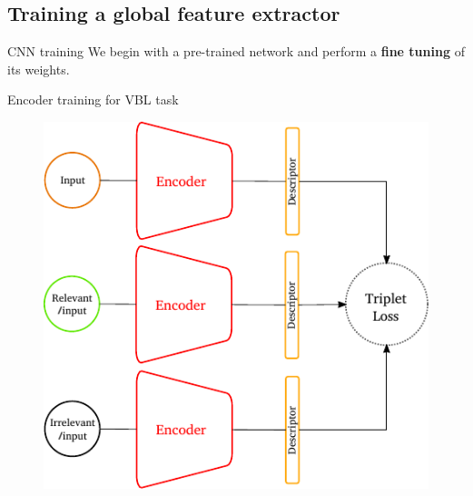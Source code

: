 \subsection{Training a global feature extractor}

\label{sec:modality_transfer}


\begin{frame}{CNN training}
	We begin with a pre-trained network and perform a \textbf{fine tuning} of its weights.
	\begin{block}{Encoder training for VBL task}
		\begin{figure}[c]
			\includegraphics[width=0.5\linewidth]{vect/encoder_training.pdf}					
		\end{figure}
	\end{block}
\end{frame}


